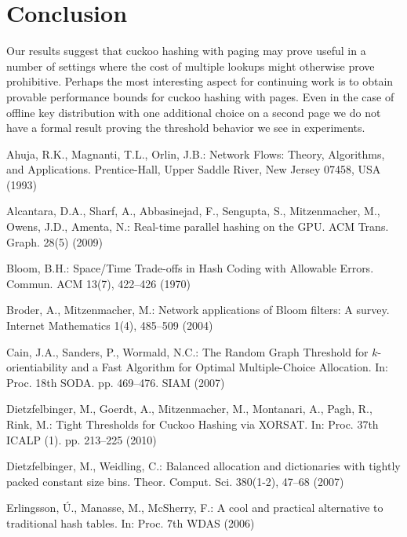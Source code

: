 \let\accentvec\vec \documentclass{llncs}
\begin{document}
\section{Conclusion}
Our results suggest that cuckoo hashing with paging may prove useful in a number of settings where the cost of multiple lookups might otherwise prove prohibitive. Perhaps the most interesting aspect for continuing work is to obtain
provable performance bounds for cuckoo hashing with pages.  Even in
the case of offline key distribution with one additional choice on a
second page we do not have a formal result proving the threshold
behavior we see in experiments.     

\begin{thebibliography}{10}
\providecommand{\url}[1]{\texttt{#1}}
\providecommand{\urlprefix}{URL }

Ahuja, R.K., Magnanti, T.L., Orlin, J.B.: {Network Flows: Theory, Algorithms,
  and Applications}. Prentice-Hall, Upper Saddle River, New Jersey 07458, USA
  (1993)

Alcantara, D.A., Sharf, A., Abbasinejad, F., Sengupta, S., Mitzenmacher, M.,
  Owens, J.D., Amenta, N.: {Real-time parallel hashing on the GPU}. ACM Trans.
  Graph.  28(5) (2009)

Bloom, B.H.: {Space/Time Trade-offs in Hash Coding with Allowable Errors}.
  Commun. ACM  13(7),  422--426 (1970)

Broder, A., Mitzenmacher, M.: {Network applications of Bloom filters: A
  survey}. Internet Mathematics  1(4),  485--509 (2004)

Cain, J.A., Sanders, P., Wormald, N.C.: {The Random Graph Threshold for
  $k$-orientiability and a Fast Algorithm for Optimal Multiple-Choice
  Allocation}. In: Proc. 18th SODA. pp. 469--476. SIAM (2007)

Dietzfelbinger, M., Goerdt, A., Mitzenmacher, M., Montanari, A., Pagh, R.,
  Rink, M.: {Tight Thresholds for Cuckoo Hashing via XORSAT}. In: Proc. 37th
  ICALP (1). pp. 213--225 (2010)

Dietzfelbinger, M., Weidling, C.: {Balanced allocation and dictionaries with
  tightly packed constant size bins}. Theor. Comput. Sci.  380(1-2),  47--68
  (2007)

Erlingsson, {\'U}., Manasse, M., McSherry, F.: {A cool and practical
  alternative to traditional hash tables}. In: Proc. 7th WDAS (2006)


\end{thebibliography}
\end{document}
